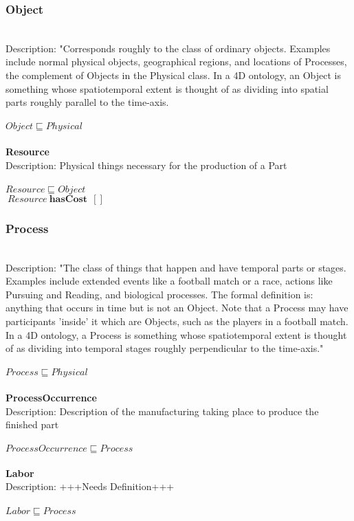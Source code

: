 \subsubsection{Object}\\
Description: "Corresponds roughly to the class of ordinary objects.  Examples include normal physical objects, geographical regions, and locations of Processes, the complement of Objects in the Physical class.  In a 4D ontology, an Object is something whose spatiotemporal extent is thought of as dividing into spatial parts roughly parallel to the time-axis.\cite{Pease2011}\\
\\$ Object \sqsubseteq Physical$
\\\\   \textbf{Resource}\\Description: Physical things necessary for the production of a Part\\
\\$ Resource \sqsubseteq Object$
\\$\: Resource\: \textbf{hasCost}\: \: []$
\subsubsection{Process}\\
Description: "The class of things that happen and have temporal parts or stages.  Examples include extended events like a football match or a race, actions like Pursuing and Reading, and biological processes. The formal definition is: anything that occurs in time but is not an Object.  Note that a Process may have participants 'inside' it which are Objects, such as the players in a football match.  In a 4D ontology, a Process is something whose spatiotemporal extent is thought of as dividing into temporal stages roughly perpendicular to the time-axis." \cite{Pease2011}\\
\\$ Process \sqsubseteq Physical$
\\\\   \textbf{ProcessOccurrence}\\Description: Description of the manufacturing taking place to produce the finished part\\
\\$ ProcessOccurrence \sqsubseteq Process$
\\\\   \textbf{Labor}\\Description: +++Needs Definition+++\\
\\$ Labor \sqsubseteq Process$
